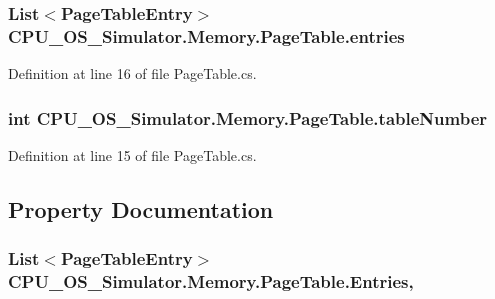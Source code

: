 \subsubsection[{entries}]{\setlength{\rightskip}{0pt plus 5cm}List$<${\bf Page\+Table\+Entry}$>$ C\+P\+U\+\_\+\+O\+S\+\_\+\+Simulator.\+Memory.\+Page\+Table.\+entries\hspace{0.3cm}{\ttfamily [private]}}\label{class_c_p_u___o_s___simulator_1_1_memory_1_1_page_table_afaec11faaccf2f772fa8d5c52cfcf9ad}


Definition at line 16 of file Page\+Table.\+cs.

\hypertarget{class_c_p_u___o_s___simulator_1_1_memory_1_1_page_table_aef0b423d8ee9ee97104aba03cef1a584}{}
\subsubsection[{table\+Number}]{\setlength{\rightskip}{0pt plus 5cm}int C\+P\+U\+\_\+\+O\+S\+\_\+\+Simulator.\+Memory.\+Page\+Table.\+table\+Number\hspace{0.3cm}{\ttfamily [private]}}\label{class_c_p_u___o_s___simulator_1_1_memory_1_1_page_table_aef0b423d8ee9ee97104aba03cef1a584}


Definition at line 15 of file Page\+Table.\+cs.



\subsection{Property Documentation}
\hypertarget{class_c_p_u___o_s___simulator_1_1_memory_1_1_page_table_a39686465a9c618e73a0a2d8f316ffa2c}{}
\subsubsection[{Entries}]{\setlength{\rightskip}{0pt plus 5cm}List$<${\bf Page\+Table\+Entry}$>$ C\+P\+U\+\_\+\+O\+S\+\_\+\+Simulator.\+Memory.\+Page\+Table.\+Entries\hspace{0.3cm}{\ttfamily [get]}, {\ttfamily [set]}}\label{class_c_p_u___o_s___simulator_1_1_memory_1_1_page_table_a39686465a9c618e73a0a2d8f316ffa2c}


